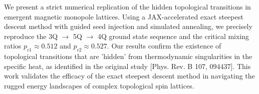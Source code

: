 We present a strict numerical replication of the hidden topological transitions in emergent magnetic monopole lattices. Using a JAX-accelerated exact steepest descent method with guided seed injection and simulated annealing, we precisely reproduce the 3Q $\to$ 5Q $\to$ 4Q ground state sequence and the critical mixing ratios $p_{c1} \approx 0.512$ and $p_{c2} \approx 0.527$. Our results confirm the existence of topological transitions that are 'hidden' from thermodynamic singularities in the specific heat, as identified in the original study [Phys. Rev. B 107, 094437]. This work validates the efficacy of the exact steepest descent method in navigating the rugged energy landscapes of complex topological spin lattices.
